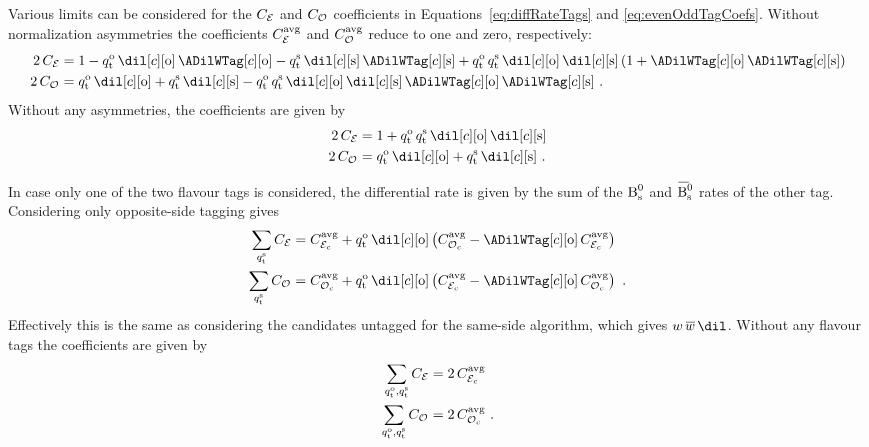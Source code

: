 Various limits can be considered for the $\CEven$ and $\COdd$ coefficients in Equations~\ref{eq:diffRateTags} and \ref{eq:evenOddTagCoefs}.
Without \BsBsbar{} normalization asymmetries the coefficients $\avgCEven$ and $\avgCOdd$ reduce to one and zero, respectively:
\begin{subequations}
  \begin{align}
    2\,\CEven &= 1
                 - \qtOS\,\dilOS[c]\,\ADilWTagOS[c]
                 - \qtSS\,\dilSS[c]\,\ADilWTagSS[c]
                 + \qtOS\,\qtSS\,\dilOS[c]\,\dilSS[c]\,(1 + \ADilWTagOS[c]\,\ADilWTagSS[c]) \\
    2\,\COdd &=  \qtOS\,\dilOS[c]
                 + \qtSS\,\dilSS[c]
                 - \qtOS\,\qtSS\,\dilOS[c]\,\dilSS[c]\,\ADilWTagOS[c]\,\ADilWTagSS[c] \ .
  \end{align}
\end{subequations}
Without any asymmetries, the coefficients are given by
\begin{subequations}
  \label{eq:evenOddTagCoefsNoAsym}
  \begin{align}
    2\,\CEven &= 1
                 + \qtOS\,\qtSS\,\dilOS[c]\,\dilSS[c] \\
    2\,\COdd &=  \qtOS\,\dilOS[c]
                 + \qtSS\,\dilSS[c] \ .
  \end{align}
\end{subequations}

In case only one of the two flavour tags is considered, the differential rate is given by the sum of the $\Bs$ and $\Bsbar$ rates of the
other tag. Considering only opposite-side tagging gives
\begin{subequations}
  \begin{align}
    \sum_{\qtSS} \CEven &= \avgCEven[c] + \qtOS\,\dilOS[c]\left(\avgCOdd[c]  - \ADilWTagOS[c]\,\avgCEven[c] \right) \\
    \sum_{\qtSS} \COdd  &= \avgCOdd[c]  + \qtOS\,\dilOS[c]\left(\avgCEven[c] - \ADilWTagOS[c]\,\avgCOdd[c]  \right) \ .
  \end{align}
\end{subequations}
Effectively this is the same as considering the candidates untagged for the same-side algorithm, which gives
$\wTag$\textequiv$\wTagBar$\textto$\dil$. Without any flavour tags the coefficients are given by
\begin{subequations}
  \begin{align}
    \sum_{\qtOS,\qtSS} \CEven &= 2\,\avgCEven[c] \\
    \sum_{\qtOS,\qtSS} \COdd  &= 2\,\avgCOdd[c]  \ .
  \end{align}
\end{subequations}

